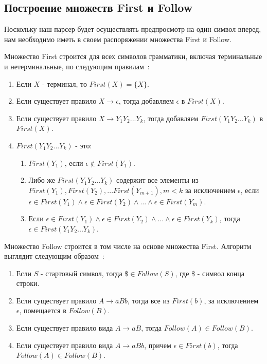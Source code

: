 \subsection{Построение множеств First и Follow}
Поскольку наш парсер будет осуществлять предпросмотр на один символ вперед, нам необходимо иметь в своем распоряжении множества First и Follow. 

Множество First строится для всех символов грамматики, включая терминальные и нетерминальные, по следующим правилам~\autocite{first-follow}:
\begin{enumerate}
  \item Если $X$ - терминал, то $First(X) = \{X\}$.
  \item Если существует правило $X \rightarrow \epsilon$, тогда добавляем $\epsilon$ в $First(X)$.
  \item Если существует правило $X \rightarrow Y_1Y_2...Y_k$, тогда добавляем $First(Y_1Y_2...Y_k)$ в $First(X)$.
  \item $First(Y_1Y_2...Y_k)$ - это:
  \begin{enumerate}
    \item $First(Y_1)$, если $\epsilon \notin First(Y_1)$.
    \item Либо же $First(Y_1Y_2...Y_k)$ содержит все элементы из $First(Y_1),First(Y_2),...First(Y_{m+1}), m < k$  за исключением $\epsilon$, если $\epsilon \in First(Y_1) \land \epsilon \in First(Y_2) \land \dots \land \epsilon \in First(Y_m)$.
    \item Если $\epsilon \in First(Y_1) \land \epsilon \in First(Y_2) \land \dots \land \epsilon \in First(Y_k)$, тогда $\epsilon \in First(Y_1Y_2...Y_k)$.
  \end{enumerate}
\end{enumerate}

Множество Follow строится в том числе на основе множества First. Алгоритм выглядит следующим образом~\autocite{first-follow}:
\begin{enumerate}
  \item Если $S$ - стартовый символ, тогда $\$ \in Follow(S)$, где $\$$ - символ конца строки.
  \item Если существует правило $A \rightarrow aBb$, тогда все из $First(b)$, за исключением $\epsilon$, помещается в $Follow(B)$.
  \item Если существует правило вида $A \rightarrow aB$, тогда $Follow(A) \in Follow(B)$.
  \item Если существует правило вида $A \rightarrow aBb$, причем $\epsilon \in First(b)$, тогда $Follow(A) \in Follow(B)$.
\end{enumerate}

